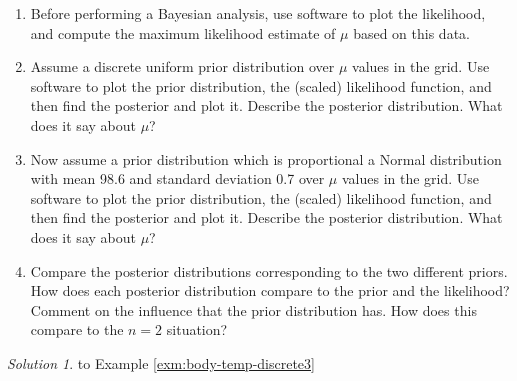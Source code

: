 \documentclass[
]{book}
\providecommand{\tightlist}{%
  \setlength{\itemsep}{0pt}\setlength{\parskip}{0pt}}
\theoremstyle{definition}
\theoremstyle{definition}
\theoremstyle{definition}
\theoremstyle{remark}
\newtheorem*{solution}{Solution}
\begin{document}
\begin{enumerate}
\def\labelenumi{\arabic{enumi}.}
\tightlist
\item
  Before performing a Bayesian analysis, use software to plot the likelihood, and compute the maximum likelihood estimate of \(\mu\) based on this data.
\item
  Assume a discrete uniform prior distribution over \(\mu\) values in the grid.
  Use software to plot the prior distribution, the (scaled) likelihood function, and then find the posterior and plot it. Describe the posterior distribution.
  What does it say about \(\mu\)?
\item
  Now assume a prior distribution which is proportional a Normal distribution with mean 98.6 and standard deviation 0.7 over \(\mu\) values in the grid.
  Use software to plot the prior distribution, the (scaled) likelihood function, and then find the posterior and plot it. Describe the posterior distribution.
  What does it say about \(\mu\)?
\item
  Compare the posterior distributions corresponding to the two different priors. How does each posterior distribution compare to the prior and the likelihood? Comment on the influence that the prior distribution has. How does this compare to the \(n=2\) situation?
\end{enumerate}

\begin{solution}
{}to Example \ref{exm:body-temp-discrete3}
\end{solution}
\end{document}
